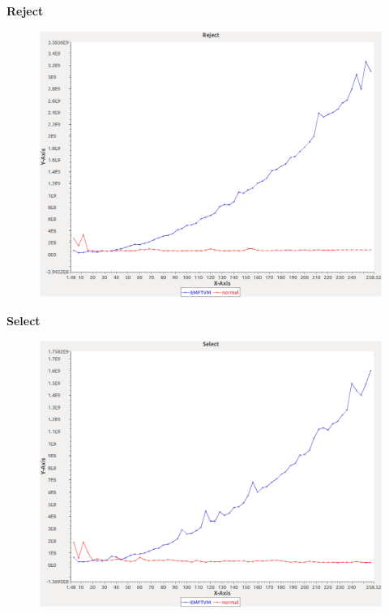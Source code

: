 \noindent\textbf{Reject}

\begin{figure}[h]
\centering
\includegraphics[width=\textwidth]{graphs/sequence/Reject}
\end{figure}
\pagebreak

\noindent\textbf{Select}

\begin{figure}[h]
\centering
\includegraphics[width=\textwidth]{graphs/sequence/Select}
\end{figure}
\pagebreak

